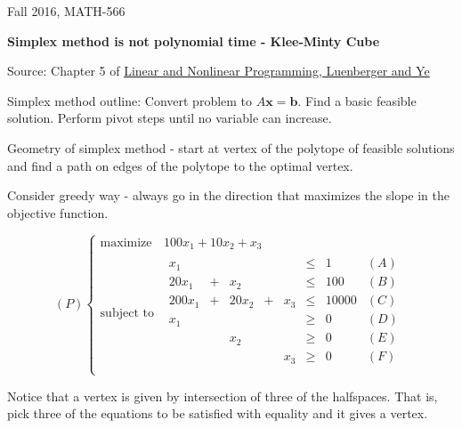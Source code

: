 \documentclass[11pt]{article}
\begin{document}
Fall  2016, MATH-566

\centerline{{\Large \textbf{Simplex method is not polynomial time - Klee-Minty Cube}}}


Source: Chapter 5 of \href{http://www.amazon.com/Nonlinear-Programming-International-Operations-Management/dp/0387745025/ref=sr_1_2?s=books&ie=UTF8&qid=1442802899&sr=1-2&keywords=linear+and+nonlinear+programming}{Linear and Nonlinear Programming, Luenberger and Ye}

Simplex method outline: Convert problem to $A\mathbf{x} = \mathbf{b}$. Find a basic feasible solution. Perform pivot steps until no variable can increase.

Geometry of simplex method - start at vertex of the polytope of feasible  solutions and find a path on edges of the polytope 
to the optimal vertex.

Consider greedy way - always go in the direction that maximizes the slope in the objective function.


\[
(P) \begin{cases}
\text{maximize}  & 100x_1 + 10x_2 + x_3  \\
\text{subject to}  & 
\begin{array}{rcrcrclr} 
      x_1 &   &          &      &         & \leq & 1  &       (A)\\
  20x_1 & + & x_2   &     &         & \leq & 100  &    (B)\\
200x_1 & + &20x_2 & + & x_3  & \leq & 10000  &  (C)\\
      x_1 &     &           &      &         & \geq & 0  &  (D)\\
             &    &      x_2 &     &         & \geq & 0  &  (E)\\
             &   &  &              & x_3  & \geq & 0  &  (F)\\
\end{array}    
\end{cases}
\]

Notice that a vertex is given by intersection of three of the halfspaces. That is, pick three of the equations to be satisfied
with equality and it gives a vertex.
\end{document}

